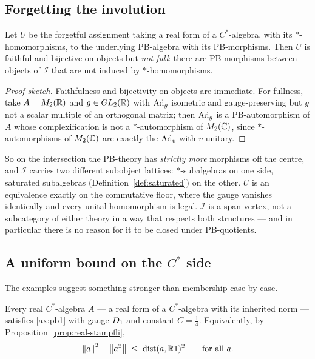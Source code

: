 \subsection{Forgetting the involution}

\begin{proposition}\label{prop:U-faithful}
Let $U$ be the forgetful assignment taking a real form of a $C^*$-algebra, with
its $*$-homomorphisms, to the underlying PB-algebra with its PB-morphisms.
Then $U$ is faithful and bijective on objects but \emph{not full}: there are
PB-morphisms between objects of $\mathcal{I}$ that are not induced by
$*$-homomorphisms.
\end{proposition}

\begin{proof}[Proof sketch]
Faithfulness and bijectivity on objects are immediate.  For fullness, take
$A=M_2(\mathbb{R})$ and $g\in GL_2(\mathbb{R})$ with $\operatorname{Ad}_g$ isometric and gauge-preserving
but $g$ not a scalar multiple of an orthogonal matrix; then $\operatorname{Ad}_g$ is a
PB-automorphism of $A$ whose complexification is not a $*$-automorphism of
$M_2(\mathbb{C})$, since $*$-automorphisms of $M_2(\mathbb{C})$ are exactly the $\operatorname{Ad}_v$ with
$v$ unitary.
\end{proof}

\begin{remark}
So on the intersection the PB-theory has \emph{strictly more} morphisms off the
centre, and $\mathcal{I}$ carries two different subobject lattices:
$*$-subalgebras on one side, saturated subalgebras
(Definition~\ref{def:saturated}) on the other.  $U$ is an equivalence exactly on
the commutative floor, where the gauge vanishes identically and every unital
homomorphism is legal.  $\mathcal{I}$ is a span-vertex, not a subcategory of
either theory in a way that respects both structures --- and in particular there
is no reason for it to be closed under PB-quotients.
\end{remark}

\subsection{A uniform bound on the $C^*$ side}

The examples suggest something stronger than membership case by case.

\begin{conjecture}\label{conj:cstar-uniform}
Every real $C^*$-algebra $A$ --- a real form of a $C^*$-algebra with its
inherited norm --- satisfies \eqref{ax:pb1} with gauge $D_1$ and constant
$C=\tfrac14$.  Equivalently, by Proposition~\ref{prop:real-stampfli},
\[
  \left\lVert a\right\rVert^2-\left\lVert a^2\right\rVert\;\le\;\operatorname{dist}(a,\mathbb{R}1)^2\qquad\text{for all }a .
\]
\end{conjecture}

